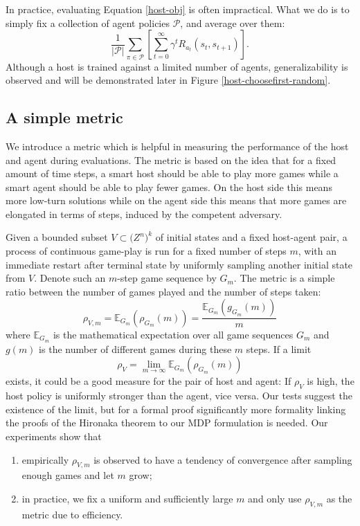 \documentclass{article}
\theoremstyle{plain}
\theoremstyle{definition}
\theoremstyle{remark}
\begin{document}
In practice, evaluating Equation \eqref{host-obj} is often impractical. What we do is to simply fix a collection of agent policies $\mathcal P$, and average over them:
\begin{equation}\label{practical-obj}
\dfrac{1}{|\mathcal P|}\sum\limits_{\pi\in\mathcal P}\left[\sum\limits_{t=0}^\infty \gamma^t R_{a_t}(s_t, s_{t+1})\right].
\end{equation}
Although a host is trained against a limited number of agents, generalizability is observed and will be demonstrated later in Figure \ref{host-choosefirst-random}.

\subsection{A simple metric}\label{rho-metric}

We introduce a metric which is helpful in measuring the performance of the host and agent during evaluations. The metric is based on the idea that for a fixed amount of time steps, a smart host should be able to play more games while a smart agent should be able to play fewer games. On the host side this means more low-turn solutions while on the agent side this means that more games are elongated in terms of steps, induced by the competent adversary.

Given a bounded subset $V\subset \mathbb (Z^n)^k$ of initial states and a fixed host-agent pair, a process of continuous game-play is run for a fixed number of steps $m$, with an immediate restart after terminal state by uniformly sampling another initial state from $V$. Denote such an $m$-step game sequence by $G_m$. The metric is a simple ratio between the number of games played and the number of steps taken:
\[\rho_{V,m} = \mathbb E_{G_m}(\rho_{G_m}(m))=\frac{\mathbb E_{G_m}(g_{G_m}(m))}{m}\]
where $\mathbb E_{G_m}$ is the mathematical expectation over all game sequences $G_m$ and $g(m)$ is the number of different games during these $m$ steps. If a limit
\[\rho_V=\lim_{m\to \infty}\mathbb E_{G_m}(\rho_{G_m}(m))\]
exists, it could be a good measure for the pair of host and agent: If $\rho_V$ is high, the host policy is uniformly stronger than the agent, vice versa.
Our tests suggest the existence of the limit, but for a formal proof significantly more formality linking the proofs of the Hironaka theorem to our MDP formulation is needed. Our experiments show that 
\begin{enumerate}
    \item empirically $\rho_{V, m}$ is observed to have a tendency of convergence after sampling enough games and let $m$ grow;
    \item in practice, we fix a uniform and sufficiently large $m$ and only use $\rho_{V, m}$ as the metric due to efficiency.
\end{enumerate} 
\end{document}
